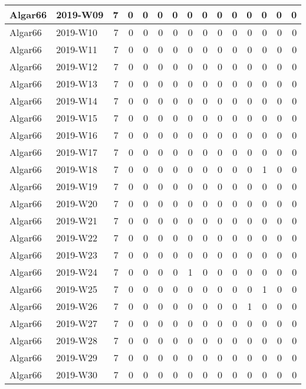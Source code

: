 \documentclass[]{book}
\begin{document}
\begin{table}
\begin{tabular}[t]{l|l|r|r|r|r|r|r|r|r|r|r|r|r|r}
\hline
Algar66 & 2019-W09 & 7 & 0 & 0 & 0 & 0 & 0 & 0 & 0 & 0 & 0 & 0 & 0 & 0\\
\hline
Algar66 & 2019-W10 & 7 & 0 & 0 & 0 & 0 & 0 & 0 & 0 & 0 & 0 & 0 & 0 & 0\\
\hline
Algar66 & 2019-W11 & 7 & 0 & 0 & 0 & 0 & 0 & 0 & 0 & 0 & 0 & 0 & 0 & 0\\
\hline
Algar66 & 2019-W12 & 7 & 0 & 0 & 0 & 0 & 0 & 0 & 0 & 0 & 0 & 0 & 0 & 0\\
\hline
Algar66 & 2019-W13 & 7 & 0 & 0 & 0 & 0 & 0 & 0 & 0 & 0 & 0 & 0 & 0 & 0\\
\hline
Algar66 & 2019-W14 & 7 & 0 & 0 & 0 & 0 & 0 & 0 & 0 & 0 & 0 & 0 & 0 & 0\\
\hline
Algar66 & 2019-W15 & 7 & 0 & 0 & 0 & 0 & 0 & 0 & 0 & 0 & 0 & 0 & 0 & 0\\
\hline
Algar66 & 2019-W16 & 7 & 0 & 0 & 0 & 0 & 0 & 0 & 0 & 0 & 0 & 0 & 0 & 0\\
\hline
Algar66 & 2019-W17 & 7 & 0 & 0 & 0 & 0 & 0 & 0 & 0 & 0 & 0 & 0 & 0 & 0\\
\hline
Algar66 & 2019-W18 & 7 & 0 & 0 & 0 & 0 & 0 & 0 & 0 & 0 & 0 & 1 & 0 & 0\\
\hline
Algar66 & 2019-W19 & 7 & 0 & 0 & 0 & 0 & 0 & 0 & 0 & 0 & 0 & 0 & 0 & 0\\
\hline
Algar66 & 2019-W20 & 7 & 0 & 0 & 0 & 0 & 0 & 0 & 0 & 0 & 0 & 0 & 0 & 0\\
\hline
Algar66 & 2019-W21 & 7 & 0 & 0 & 0 & 0 & 0 & 0 & 0 & 0 & 0 & 0 & 0 & 0\\
\hline
Algar66 & 2019-W22 & 7 & 0 & 0 & 0 & 0 & 0 & 0 & 0 & 0 & 0 & 0 & 0 & 0\\
\hline
Algar66 & 2019-W23 & 7 & 0 & 0 & 0 & 0 & 0 & 0 & 0 & 0 & 0 & 0 & 0 & 0\\
\hline
Algar66 & 2019-W24 & 7 & 0 & 0 & 0 & 0 & 1 & 0 & 0 & 0 & 0 & 0 & 0 & 0\\
\hline
Algar66 & 2019-W25 & 7 & 0 & 0 & 0 & 0 & 0 & 0 & 0 & 0 & 0 & 1 & 0 & 0\\
\hline
Algar66 & 2019-W26 & 7 & 0 & 0 & 0 & 0 & 0 & 0 & 0 & 0 & 1 & 0 & 0 & 0\\
\hline
Algar66 & 2019-W27 & 7 & 0 & 0 & 0 & 0 & 0 & 0 & 0 & 0 & 0 & 0 & 0 & 0\\
\hline
Algar66 & 2019-W28 & 7 & 0 & 0 & 0 & 0 & 0 & 0 & 0 & 0 & 0 & 0 & 0 & 0\\
\hline
Algar66 & 2019-W29 & 7 & 0 & 0 & 0 & 0 & 0 & 0 & 0 & 0 & 0 & 0 & 0 & 0\\
\hline
Algar66 & 2019-W30 & 7 & 0 & 0 & 0 & 0 & 0 & 0 & 0 & 0 & 0 & 0 & 0 & 0\\

\end{tabular}
\end{table}
\end{document}
